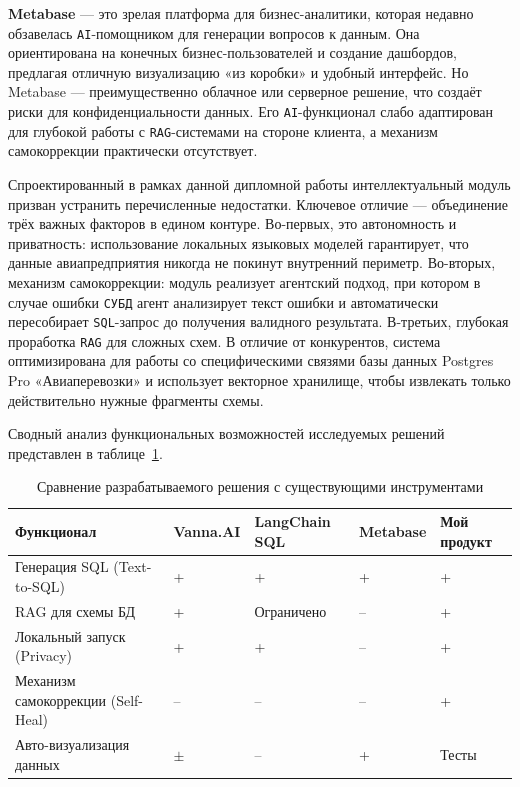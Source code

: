 \textbf{Metabase} — это зрелая платформа для бизнес-аналитики, которая недавно обзавелась \texttt{AI}-помощником для генерации вопросов к данным. Она ориентирована на конечных бизнес-пользователей и создание дашбордов, предлагая отличную визуализацию «из коробки» и удобный интерфейс. Но Metabase — преимущественно облачное или серверное решение, что создаёт риски для конфиденциальности данных. Его \texttt{AI}-функционал слабо адаптирован для глубокой работы с \texttt{RAG}-системами на стороне клиента, а механизм самокоррекции практически отсутствует.

Спроектированный в рамках данной дипломной работы интеллектуальный модуль призван устранить перечисленные недостатки. Ключевое отличие — объединение трёх важных факторов в едином контуре. Во-первых, это автономность и приватность: использование локальных языковых моделей гарантирует, что данные авиапредприятия никогда не покинут внутренний периметр. Во-вторых, механизм самокоррекции: модуль реализует агентский подход, при котором в случае ошибки \texttt{СУБД} агент анализирует текст ошибки и автоматически пересобирает \texttt{SQL}-запрос до получения валидного результата. \cite{chaturvedi2025sql} В-третьих, глубокая проработка \texttt{RAG} для сложных схем. \cite{arxiv2410rag} В отличие от конкурентов, система оптимизирована для работы со специфическими связями базы данных Postgres Pro «Авиаперевозки» и использует векторное хранилище, чтобы извлекать только действительно нужные фрагменты схемы.

Сводный анализ функциональных возможностей исследуемых решений представлен в таблице~\ref{table:comparison}.

\begin{table}[h!]
    \centering
    \small   %
    \caption{Сравнение разрабатываемого решения с существующими инструментами}
    \label{table:comparison}
    \begin{tabularx}{\textwidth}{|>{\hsize=1.2\hsize\raggedright\arraybackslash}X|
                                  |>{\hsize=0.95\hsize\centering\arraybackslash}X|
                                  |>{\hsize=0.95\hsize\centering\arraybackslash}X|
                                  |>{\hsize=0.95\hsize\centering\arraybackslash}X|
                                  |>{\hsize=0.95\hsize\centering\arraybackslash}X|}
    \hline
    \textbf{Функционал} & \textbf{Vanna.AI} & \textbf{LangChain SQL} & \textbf{Metabase} & \textbf{Мой продукт} \\
    \hline
    Генерация SQL (Text-to-SQL) & + & + & + & + \\
    \hline
    RAG для схемы БД & + & Ограничено & -- & + \\
    \hline
    Локальный запуск (Privacy) & + & + & -- & + \\
    \hline
    Механизм самокоррекции (Self-Heal) & -- & -- & -- & + \\
    \hline
    Авто-визуализация данных & $\pm$ & -- & + & Тесты \\
    \hline
    \end{tabularx}
\end{table} 

